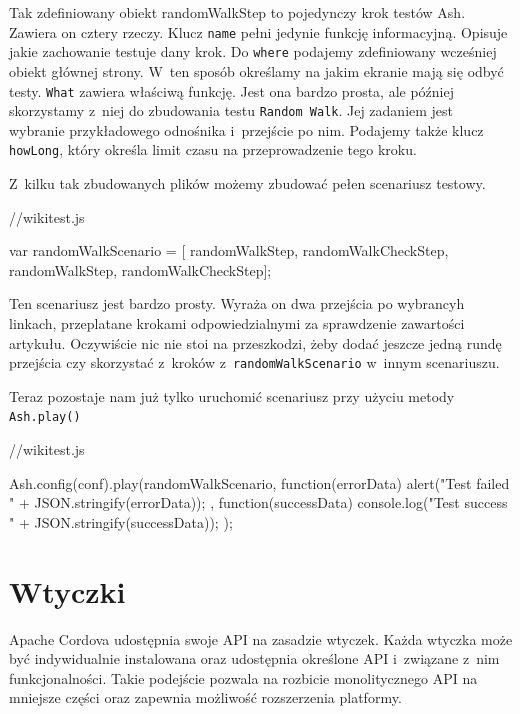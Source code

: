\documentclass[brudnopis]{xmgr}
\begin{document}
Tak zdefiniowany obiekt randomWalkStep to pojedynczy krok testów Ash. Zawiera on cztery rzeczy. Klucz \texttt{name} pełni jedynie funkcję informacyjną. Opisuje jakie zachowanie testuje dany krok. Do \texttt{where} podajemy zdefiniowany wcześniej obiekt głównej strony. W~ten sposób określamy na jakim ekranie mają się odbyć testy. \texttt{What} zawiera właściwą funkcję. Jest ona bardzo prosta, ale później skorzystamy z~niej do zbudowania testu \texttt{Random Walk}. Jej zadaniem jest wybranie przykładowego odnośnika i~przejście po nim. Podajemy także klucz \texttt{howLong}, który określa limit czasu na przeprowadzenie tego kroku.

Z~kilku tak zbudowanych plików możemy zbudować pełen scenariusz testowy.

\begin{javascriptcode}
   //wikitest.js

   var randomWalkScenario = [
        randomWalkStep,
        randomWalkCheckStep,
        randomWalkStep,
        randomWalkCheckStep];

\end{javascriptcode}

Ten scenariusz jest bardzo prosty. Wyraża on dwa przejścia po wybrancyh linkach, przeplatane krokami odpowiedzialnymi za sprawdzenie zawartości artykułu. Oczywiście nic nie stoi na przeszkodzi, żeby dodać jeszcze jedną rundę przejścia czy skorzystać z~kroków z~\texttt{randomWalkScenario} w~innym scenariuszu.

Teraz pozostaje nam już tylko uruchomić scenariusz przy użyciu metody \texttt{Ash.play()}

\begin{javascriptcode}
   //wikitest.js

   Ash.config(conf).play(randomWalkScenario, function(errorData){
        alert("Test failed " + JSON.stringify(errorData));
    }, function(successData){
        console.log("Test success " + JSON.stringify(successData));
    });

\end{javascriptcode}

\chapter{Wtyczki}

Apache Cordova udostępnia swoje API na zasadzie wtyczek. Każda wtyczka może być indywidualnie instalowana oraz udostępnia określone API i~związane z~nim funkcjonalności. Takie podejście pozwala na rozbicie monolitycznego API na mniejsze części oraz zapewnia możliwość rozszerzenia platformy.
\end{document}
